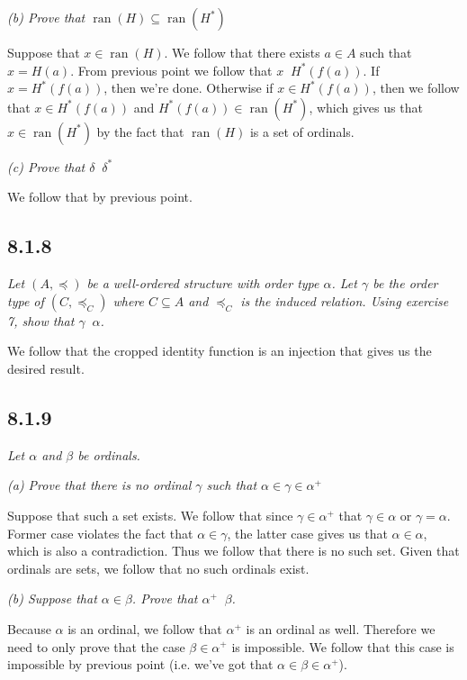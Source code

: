 \documentclass[11pt,oneside,titlepage]{book}
\DeclareMathOperator \ran {ran}
\DeclareMathOperator \ineq {\underline{\in}}
\begin{document}
\textit{(b) Prove that $\ran(H) \subseteq \ran(H^*)$}

Suppose that $x \in \ran(H)$. We follow that there exists $a \in A$ such that
$x = H(a)$. From previous point we follow that $x \ineq H^*(f(a))$.
If $x = H^*(f(a))$, then we're done. Otherwise if $x \in H^*(f(a))$, then we follow that
$x \in H^*(f(a))$ and $H^*(f(a)) \in \ran(H^*)$, which gives us that $x \in \ran(H^*)$
by the fact that $\ran(H)$ is a set of ordinals.

\textit{(c) Prove that $\delta \ineq \delta^*$}

We follow that by previous point.

\subsection*{8.1.8}

\textit{Let $(A, \preceq)$ be a well-ordered structure with order type $\alpha$. Let
  $\gamma$ be the order type of $(C, \preceq_C)$ where $C \subseteq A$ and $\preceq_C$
  is the induced relation. Using exercise 7, show that $\gamma \ineq \alpha$.}

We follow that the cropped identity function is an injection that gives us the desired result.

\subsection*{8.1.9}

\textit{Let $\alpha$ and $\beta$ be ordinals.}

\textit{(a) Prove that there is no ordinal $\gamma$ such that $\alpha \in \gamma \in \alpha^+$}

Suppose that such a set exists. We follow that since $\gamma \in \alpha^+$ that
$\gamma \in \alpha$ or $\gamma = \alpha$. Former case violates the fact that
$\alpha \in \gamma$, the latter case gives us that $\alpha \in \alpha$, which is also
a contradiction. Thus we follow that there is no such set. Given that ordinals are sets,
we follow that no such ordinals exist.

\textit{(b) Suppose that $\alpha \in \beta$. Prove that $\alpha^+ \ineq \beta$.}

Because $\alpha$ is an ordinal, we follow that $\alpha^+$ is an ordinal as well.
Therefore we need to only prove that the case $\beta \in \alpha^+$ is impossible.
We follow that this case is impossible by previous point (i.e. we've got that
$\alpha \in \beta \in \alpha^+$).
\end{document}
